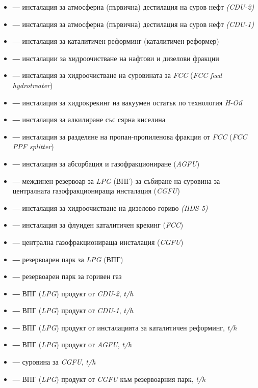 \begin{itemize}
	\item[$\rho_1$] ― инсталация за атмосферна (първична) дестилация на суров нефт \textit{(CDU-2)}
	\item[$\rho_2$] ― инсталация за атмосферна (първична) дестилация на суров нефт \textit{(CDU-1)}
	\item[$\rho_3$] ― инсталация за каталитичен реформинг (каталитичен реформер)
	\item[$\rho_4$] ― инсталации за хидроочистване на нафтови и дизелови фракции
	\item[$\rho_5$] ― инсталация за хидроочистване на суровината за \textit{FCC} (\textit{FCC feed hydrotreater})
	\item[$\rho_6$] ― инсталация за хидрокрекинг на вакуумен остатък по технология \textit{H-Oil}
	\item[$\rho_7$] ― инсталация за алкилиране със сярна киселина
	\item[$\rho_8$] ― инсталация за разделяне на пропан-пропиленова фракция от \textit{FCC} (\textit{FCC PPF splitter})
	\item[$\rho_9$] ― инсталация за абсорбация и газофракциониране (\textit{AGFU})
	\item[$\rho_{10}$] ― междинен резервоар за \textit{LPG} (ВПГ) за събиране на суровина за централната газофракционираща инсталация (\textit{CGFU})
	\item[$\rho_{11}$] ― инсталация за хидроочистване на дизелово гориво \textit{(HDS-5)}
	\item[$\rho_{12}$] ― инсталация за флуиден каталитичен крекинг (\textit{FCC})
	\item[$\rho_{13}$] ― централна газофракционираща инсталация (\textit{CGFU})
	\item[$\rho_{14}$] ― резервоарен парк за \textit{LPG} (ВПГ)
	\item[$\rho_{15}$] ― резервоарен парк за горивен газ
	
	\item[$\alpha_1$] ― ВПГ (\textit{LPG}) продукт от \textit{CDU-2}, \textit{t/h}
	\item[$\alpha_2$] ― ВПГ (\textit{LPG}) продукт от \textit{CDU-1}, \textit{t/h}
	\item[$\alpha_3$] ― ВПГ (\textit{LPG}) продукт от инсталацията за каталитичен реформинг, \textit{t/h}
	\item[$\alpha_4$] ― ВПГ (\textit{LPG}) продукт от \textit{AGFU}, \textit{t/h}
	\item[$\alpha_5$] ― суровина за \textit{CGFU}, \textit{t/h}
	\item[$\alpha_6$] ― ВПГ (\textit{LPG}) продукт от \textit{CGFU} към резервоарния парк, \textit{t/h}
	

\end{itemize}
